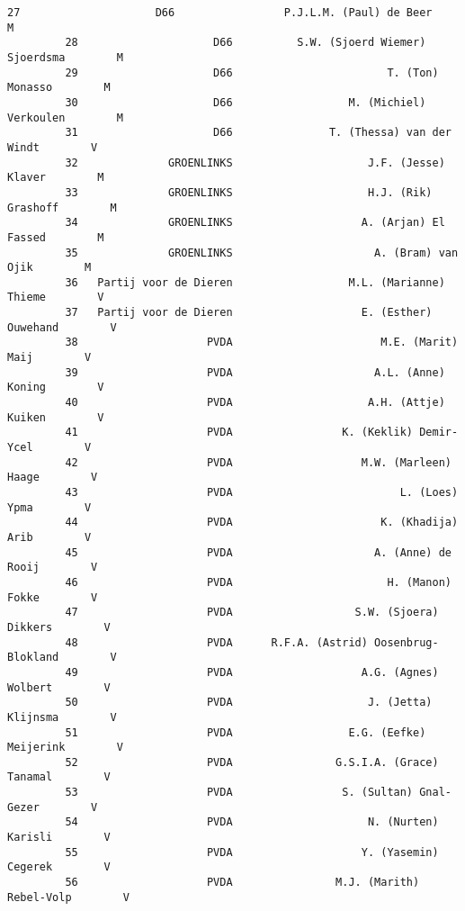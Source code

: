 \documentclass{article}
\begin{document}
\begin{Verbatim}[commandchars=\\\{\}]
         27                     D66                 P.J.L.M. (Paul) de Beer        M   
         28                     D66          S.W. (Sjoerd Wiemer) Sjoerdsma        M   
         29                     D66                        T. (Ton) Monasso        M   
         30                     D66                  M. (Michiel) Verkoulen        M   
         31                     D66               T. (Thessa) van der Windt        V   
         32              GROENLINKS                     J.F. (Jesse) Klaver        M   
         33              GROENLINKS                     H.J. (Rik) Grashoff        M   
         34              GROENLINKS                    A. (Arjan) El Fassed        M   
         35              GROENLINKS                      A. (Bram) van Ojik        M   
         36   Partij voor de Dieren                  M.L. (Marianne) Thieme        V   
         37   Partij voor de Dieren                    E. (Esther) Ouwehand        V   
         38                    PVDA                       M.E. (Marit) Maij        V   
         39                    PVDA                      A.L. (Anne) Koning        V   
         40                    PVDA                     A.H. (Attje) Kuiken        V   
         41                    PVDA                 K. (Keklik) Demir-Ycel        V   
         42                    PVDA                    M.W. (Marleen) Haage        V   
         43                    PVDA                          L. (Loes) Ypma        V   
         44                    PVDA                       K. (Khadija) Arib        V   
         45                    PVDA                      A. (Anne) de Rooij        V   
         46                    PVDA                        H. (Manon) Fokke        V   
         47                    PVDA                   S.W. (Sjoera) Dikkers        V   
         48                    PVDA      R.F.A. (Astrid) Oosenbrug-Blokland        V   
         49                    PVDA                    A.G. (Agnes) Wolbert        V   
         50                    PVDA                     J. (Jetta) Klijnsma        V   
         51                    PVDA                  E.G. (Eefke) Meijerink        V   
         52                    PVDA                G.S.I.A. (Grace) Tanamal        V   
         53                    PVDA                 S. (Sultan) Gnal-Gezer        V   
         54                    PVDA                     N. (Nurten) Karisli        V   
         55                    PVDA                    Y. (Yasemin) Cegerek        V   
         56                    PVDA                M.J. (Marith) Rebel-Volp        V   

\end{Verbatim}
\end{document}
